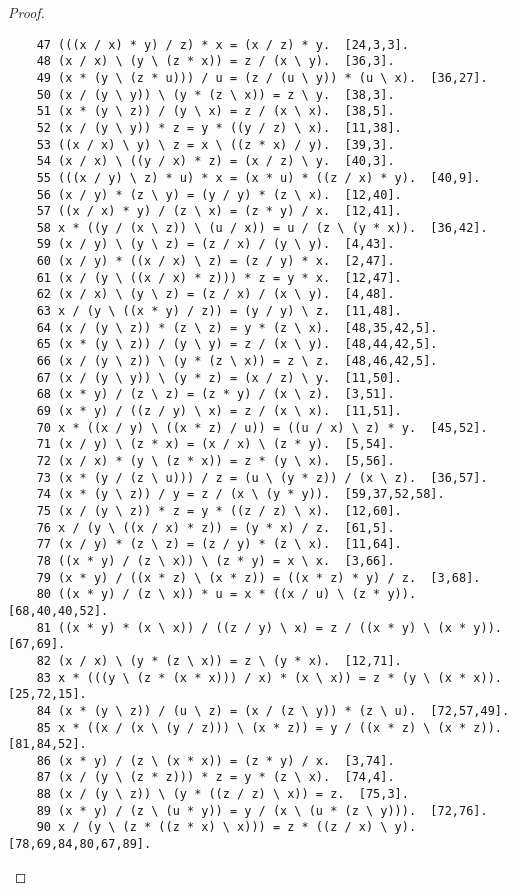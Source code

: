 \documentclass[12pt, twoside, openright]{report}
\theoremstyle{definition}
\begin{document}
\begin{proof}
\begin{lstlisting}
  	47 (((x / x) * y) / z) * x = (x / z) * y.  [24,3,3].
  	48 (x / x) \ (y \ (z * x)) = z / (x \ y).  [36,3].
  	49 (x * (y \ (z * u))) / u = (z / (u \ y)) * (u \ x).  [36,27].
  	50 (x / (y \ y)) \ (y * (z \ x)) = z \ y.  [38,3].
  	51 (x * (y \ z)) / (y \ x) = z / (x \ x).  [38,5].
  	52 (x / (y \ y)) * z = y * ((y / z) \ x).  [11,38].
  	53 ((x / x) \ y) \ z = x \ ((z * x) / y).  [39,3].
  	54 (x / x) \ ((y / x) * z) = (x / z) \ y.  [40,3].
  	55 (((x / y) \ z) * u) * x = (x * u) * ((z / x) * y).  [40,9].
  	56 (x / y) * (z \ y) = (y / y) * (z \ x).  [12,40].
  	57 ((x / x) * y) / (z \ x) = (z * y) / x.  [12,41].
  	58 x * ((y / (x \ z)) \ (u / x)) = u / (z \ (y * x)).  [36,42].
  	59 (x / y) \ (y \ z) = (z / x) / (y \ y).  [4,43].
  	60 (x / y) * ((x / x) \ z) = (z / y) * x.  [2,47].
  	61 (x / (y \ ((x / x) * z))) * z = y * x.  [12,47].
  	62 (x / x) \ (y \ z) = (z / x) / (x \ y).  [4,48].
  	63 x / (y \ ((x * y) / z)) = (y / y) \ z.  [11,48].
  	64 (x / (y \ z)) * (z \ z) = y * (z \ x).  [48,35,42,5].
  	65 (x * (y \ z)) / (y \ y) = z / (x \ y).  [48,44,42,5].
  	66 (x / (y \ z)) \ (y * (z \ x)) = z \ z.  [48,46,42,5].
  	67 (x / (y \ y)) \ (y * z) = (x / z) \ y.  [11,50].
  	68 (x * y) / (z \ z) = (z * y) / (x \ z).  [3,51].
  	69 (x * y) / ((z / y) \ x) = z / (x \ x).  [11,51].
  	70 x * ((x / y) \ ((x * z) / u)) = ((u / x) \ z) * y.  [45,52].
  	71 (x / y) \ (z * x) = (x / x) \ (z * y).  [5,54].
  	72 (x / x) * (y \ (z * x)) = z * (y \ x).  [5,56].
  	73 (x * (y / (z \ u))) / z = (u \ (y * z)) / (x \ z).  [36,57].
  	74 (x * (y \ z)) / y = z / (x \ (y * y)).  [59,37,52,58].
  	75 (x / (y \ z)) * z = y * ((z / z) \ x).  [12,60].
  	76 x / (y \ ((x / x) * z)) = (y * x) / z.  [61,5].
  	77 (x / y) * (z \ z) = (z / y) * (z \ x).  [11,64].
  	78 ((x * y) / (z \ x)) \ (z * y) = x \ x.  [3,66].
  	79 (x * y) / ((x * z) \ (x * z)) = ((x * z) * y) / z.  [3,68].
  	80 ((x * y) / (z \ x)) * u = x * ((x / u) \ (z * y)).  [68,40,40,52].
  	81 ((x * y) * (x \ x)) / ((z / y) \ x) = z / ((x * y) \ (x * y)).  [67,69].
  	82 (x / x) \ (y * (z \ x)) = z \ (y * x).  [12,71].
  	83 x * (((y \ (z * (x * x))) / x) * (x \ x)) = z * (y \ (x * x)).  [25,72,15].
  	84 (x * (y \ z)) / (u \ z) = (x / (z \ y)) * (z \ u).  [72,57,49].
  	85 x * ((x / (x \ (y / z))) \ (x * z)) = y / ((x * z) \ (x * z)).  [81,84,52].
  	86 (x * y) / (z \ (x * x)) = (z * y) / x.  [3,74].
  	87 (x / (y \ (z * z))) * z = y * (z \ x).  [74,4].
  	88 (x / (y \ z)) \ (y * ((z / z) \ x)) = z.  [75,3].
  	89 (x * y) / (z \ (u * y)) = y / (x \ (u * (z \ y))).  [72,76].
  	90 x / (y \ (z * ((z * x) \ x))) = z * ((z / x) \ y).  [78,69,84,80,67,89].

\end{lstlisting}
\end{proof}
\end{document}
